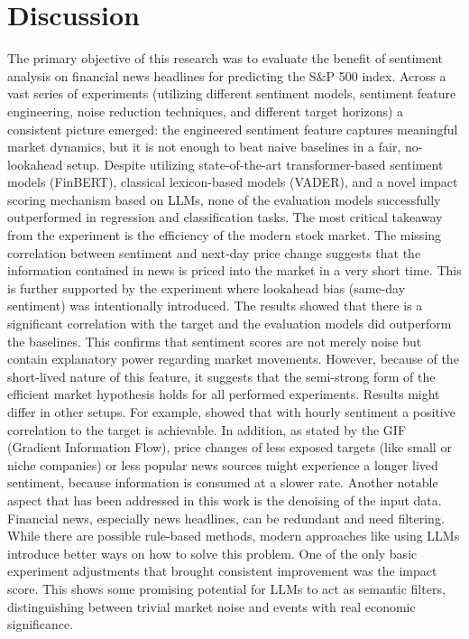 \documentclass[Master,english,IEEE]{twbook}
\begin{document}
\chapter{Discussion}
The primary objective of this research was to evaluate the benefit of sentiment analysis on financial news headlines for predicting the S\&P 500 index. Across a vast series of experiments (utilizing different sentiment models, sentiment feature engineering, noise reduction techniques, and different target horizons) a consistent picture emerged: the engineered sentiment feature captures meaningful market dynamics, but it is not enough to beat naive baselines in a fair, no-lookahead setup. Despite utilizing state-of-the-art transformer-based sentiment models (FinBERT), classical lexicon-based models (VADER), and a novel impact scoring mechanism based on LLMs, none of the evaluation models successfully outperformed in regression and classification tasks.
The most critical takeaway from the experiment is the efficiency of the modern stock market. The missing correlation between sentiment and next-day price change suggests that the information contained in news is priced into the market in a very short time. This is further supported by the experiment where lookahead bias (same-day sentiment) was intentionally introduced. The results showed that there is a significant correlation with the target and the evaluation models did outperform the baselines. This confirms that sentiment scores are not merely noise but contain explanatory power regarding market movements. However, because of the short-lived nature of this feature, it suggests that the semi-strong form of the efficient market hypothesis holds for all performed experiments.
Results might differ in other setups. For example, \cite{ANBAEEFARIMANI2022108742} showed that with hourly sentiment a positive correlation to the target is achievable. In addition, as stated by the GIF (Gradient Information Flow), price changes of less exposed targets (like small or niche companies) or less popular news sources might experience a longer lived sentiment, because information is consumed at a slower rate.
Another notable aspect that has been addressed in this work is the denoising of the input data. Financial news, especially news headlines, can be redundant and need filtering. While there are possible rule-based methods, modern approaches like using LLMs introduce better ways on how to solve this problem. One of the only basic experiment adjustments that brought consistent improvement was the impact score. This shows some promising potential for LLMs to act as semantic filters, distinguishing between trivial market noise and events with real economic significance.
\end{document}
